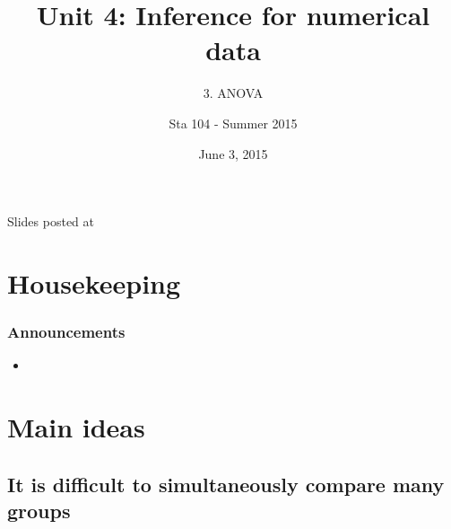 \documentclass[slidestop,compress,mathserif,12pt,t,professionalfonts,xcolor=table]{beamer}
\title{Unit 4: Inference for numerical data}
\subtitle{3. ANOVA}
\author{Sta 104 - Summer 2015}
\date{June 3, 2015}
\institute{Duke University, Department of Statistical Science}
\begin{document}



\begin{frame}[plain]

\titlepage
\vfill
{\scriptsize {} \hfill Slides posted at  \webLink{\CourseSite}{\CourseSite}}
\addtocounter{framenumber}{-1} 

\end{frame}


\section{Housekeeping}


\begin{frame}
\frametitle{Announcements}

\begin{itemize}

\item 

\end{itemize}

\end{frame}


\section{Main ideas}


\subsection{It is difficult to simultaneously compare many groups}
\label{mi1}

\end{document}
